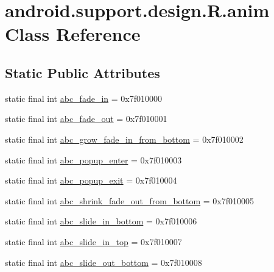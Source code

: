 \hypertarget{classandroid_1_1support_1_1design_1_1R_1_1anim}{}\section{android.\+support.\+design.\+R.\+anim Class Reference}
\label{classandroid_1_1support_1_1design_1_1R_1_1anim}
\subsection*{Static Public Attributes}
\begin{DoxyCompactItemize}
\item 
static final int \mbox{\hyperlink{classandroid_1_1support_1_1design_1_1R_1_1anim_ad1aab55327ed71f67234994b071ab794}{abc\+\_\+fade\+\_\+in}} = 0x7f010000
\item 
static final int \mbox{\hyperlink{classandroid_1_1support_1_1design_1_1R_1_1anim_a8773dce408c4627fa162cb820d04f0da}{abc\+\_\+fade\+\_\+out}} = 0x7f010001
\item 
static final int \mbox{\hyperlink{classandroid_1_1support_1_1design_1_1R_1_1anim_aa783dc7f4ea2b32ab95bce1ed298d369}{abc\+\_\+grow\+\_\+fade\+\_\+in\+\_\+from\+\_\+bottom}} = 0x7f010002
\item 
static final int \mbox{\hyperlink{classandroid_1_1support_1_1design_1_1R_1_1anim_abbdbb94547e7204418714ef8fbd684c0}{abc\+\_\+popup\+\_\+enter}} = 0x7f010003
\item 
static final int \mbox{\hyperlink{classandroid_1_1support_1_1design_1_1R_1_1anim_a233cdba0ad27e14b39b7edbb3c3ecf60}{abc\+\_\+popup\+\_\+exit}} = 0x7f010004
\item 
static final int \mbox{\hyperlink{classandroid_1_1support_1_1design_1_1R_1_1anim_a84c97609991229557250b451bec9739a}{abc\+\_\+shrink\+\_\+fade\+\_\+out\+\_\+from\+\_\+bottom}} = 0x7f010005
\item 
static final int \mbox{\hyperlink{classandroid_1_1support_1_1design_1_1R_1_1anim_a7de45fdd3717db19f19d80482c3cdbf5}{abc\+\_\+slide\+\_\+in\+\_\+bottom}} = 0x7f010006
\item 
static final int \mbox{\hyperlink{classandroid_1_1support_1_1design_1_1R_1_1anim_a8b800ace39e4bfc75cc8f15bec2ea3e4}{abc\+\_\+slide\+\_\+in\+\_\+top}} = 0x7f010007
\item 
static final int \mbox{\hyperlink{classandroid_1_1support_1_1design_1_1R_1_1anim_a39e216575b2d8d55ee799f74ccabf405}{abc\+\_\+slide\+\_\+out\+\_\+bottom}} = 0x7f010008

\end{DoxyCompactItemize}
